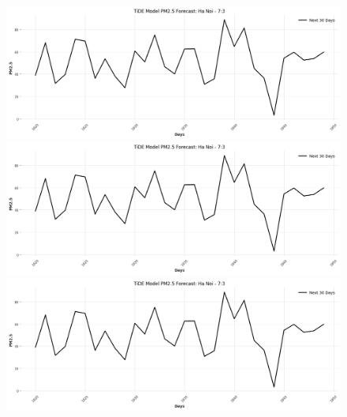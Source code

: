 \begin{figure}[H]
    \begin{minipage}{0.15\textwidth}
    \centering
    \includegraphics[width=1\textwidth]{img/final/TiDE/TiDE_7_3_HN_30D.png}
    \end{minipage}
    \hfill
    \begin{minipage}{0.15\textwidth}
    \centering
    \includegraphics[width=1\textwidth]{img/final/TiDE/TiDE_7_3_HN_30D.png}
    \end{minipage}
    \hfill
    \begin{minipage}{0.15\textwidth}
    \centering
    \includegraphics[width=1\textwidth]{img/final/TiDE/TiDE_7_3_HN_30D.png}
    \end{minipage}
    \hfill


\end{figure}
